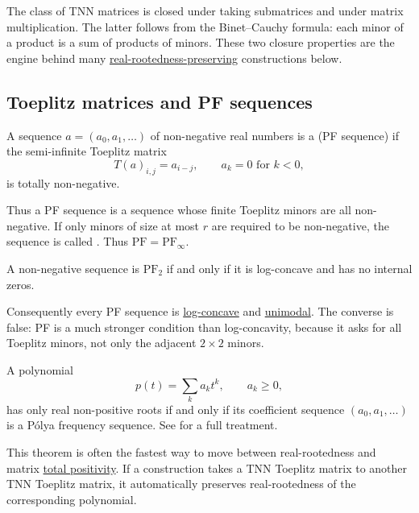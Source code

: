 The class of TNN matrices is closed under taking submatrices and under
matrix multiplication.  The latter follows from the Binet--Cauchy formula:
each minor of a product is a sum of products of minors.  These two closure
properties are the engine behind many
\hyperref[realRootedPreservers]{real-rootedness-preserving} constructions
below.

\subsection[toeplitzTnnMatrix]{Toeplitz matrices and PF sequences}

\begin{definition}\label{polyaFrequencySequenceDefinition}
A sequence \(a=(a_0,a_1,\dotsc)\) of non-negative real numbers is a
 (PF sequence) if the semi-infinite Toeplitz
matrix
\[
  T(a)_{i,j}=a_{i-j},\qquad a_k=0 \text{ for } k<0,
\]
is totally non-negative.
\end{definition}

Thus a PF sequence is a sequence whose finite Toeplitz minors are all
non-negative.  If only minors of size at most \(r\) are required to be
non-negative, the sequence is called
\label{finitePolyaFrequencySequence}.  Thus
\(\mathrm{PF}=\mathrm{PF}_\infty\).

\begin{proposition}
\label{pfTwoLogConcavity}
A non-negative sequence is \(\mathrm{PF}_2\) if and only if it is
log-concave and has no internal zeros.
\end{proposition}

Consequently every PF sequence is
\hyperref[logConcavePolynomial]{log-concave} and
\hyperref[unimodalPolynomial]{unimodal}.  The converse is false: PF is a much
stronger condition than log-concavity, because it asks for all Toeplitz minors,
not only the adjacent \(2\times 2\) minors.

\begin{theorem}
\label{aissenSchoenbergWhitney}
A polynomial
\[
  p(t)=\sum_k a_k t^k,\qquad a_k\geq 0,
\]
has only real non-positive roots if and only if its coefficient sequence
\((a_0,a_1,\dotsc)\) is a Pólya frequency sequence.
See \cite{Karlin1968} for a full treatment.
\end{theorem}

This theorem is often the fastest way to move between real-rootedness and
matrix \hyperref[totalPositivity]{total positivity}.  If a construction takes a TNN Toeplitz matrix to
another TNN Toeplitz matrix, it automatically preserves real-rootedness of
the corresponding polynomial.

